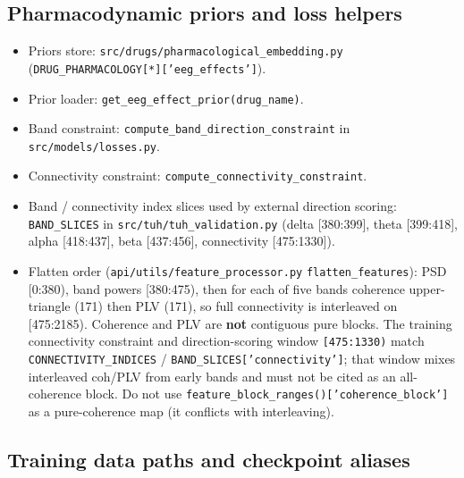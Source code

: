 \subsection{Pharmacodynamic priors and loss helpers}

\begin{itemize}
  \item Priors store: \texttt{src/\allowbreak{}drugs/\allowbreak{}pharmacological\_\allowbreak{}embedding.\allowbreak{}py} (\texttt{DRUG\_\allowbreak{}PHARMACOLOGY[*]['eeg\_\allowbreak{}effects']}).
  \item Prior loader: \texttt{get\_\allowbreak{}eeg\_\allowbreak{}effect\_\allowbreak{}prior(drug\_\allowbreak{}name)}.
  \item Band constraint: \texttt{compute\_\allowbreak{}band\_\allowbreak{}direction\_\allowbreak{}constraint} in \texttt{src/\allowbreak{}models/\allowbreak{}losses.\allowbreak{}py}.
  \item Connectivity constraint: \texttt{compute\_\allowbreak{}connectivity\_\allowbreak{}constraint}.
  \item Band / connectivity index slices used by external direction scoring: \texttt{BAND\_SLICES} in \texttt{src/\allowbreak{}tuh/\allowbreak{}tuh\_\allowbreak{}validation.\allowbreak{}py} (delta [380:399], theta [399:418], alpha [418:437], beta [437:456], connectivity [475:1330]).
  \item Flatten order (\texttt{api/\allowbreak{}utils/\allowbreak{}feature\_\allowbreak{}processor.\allowbreak{}py} \texttt{flatten\_\allowbreak{}features}): PSD [0:380), band powers [380:475), then for each of five bands coherence upper-triangle (171) then PLV (171), so full connectivity is interleaved on [475:2185). Coherence and PLV are \textbf{not} contiguous pure blocks. The training connectivity constraint and direction-scoring window \texttt{[475:1330)} match \texttt{CONNECTIVITY\_\allowbreak{}INDICES} / \texttt{BAND\_\allowbreak{}SLICES['connectivity']}; that window mixes interleaved coh/PLV from early bands and must not be cited as an all-coherence block. Do not use \texttt{feature\_\allowbreak{}block\_\allowbreak{}ranges()['coherence\_\allowbreak{}block']} as a pure-coherence map (it conflicts with interleaving).
\end{itemize}

\subsection{Training data paths and checkpoint aliases}

